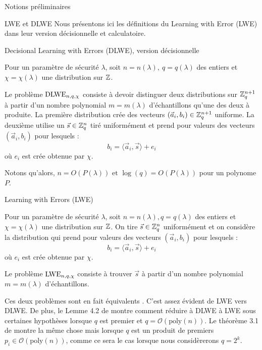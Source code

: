 \begin{section}{Notions préliminaires}
	\begin{subsection}{LWE et DLWE}
	Nous présentons ici les définitions du Learning with Error (LWE) dans leur version décisionnelle et calculatoire.
	
	\begin{definition}{Decisional Learning with Errors (DLWE), version décisionnelle}

	Pour un paramètre de sécurité $\lambda$, soit $n = n(\lambda),\ q = q(\lambda)$ des entiers et $\chi = \chi(\lambda)$ une distribution sur $\mathbb{Z}$.
	
	Le problème $\text{DLWE}_{n,q,\chi}$ consiste à devoir distinguer deux distributions sur $\mathbb{Z}_q^{n+1}$ à partir d'un nombre polynomial $m = m(\lambda)$ d'échantillons qu'une des deux à produite. La première distribution crée des vecteurs $(\vec{a}_i,b_i) \in \mathbb{Z}_q^{n+1}$ uniforme. La deuxième utilise un $\vec{s} \in \mathbb{Z}_q^n$ tiré uniformément et prend pour valeurs des vecteurs $(\vec{a}_i, b_i)$ pour lesquels :
	\[ b_i = \langle \vec{a}_i, \vec{s} \rangle + e_i \]
	où $e_i$ est crée obtenue par $\chi$. \\
	\end{definition}
	Notons qu'alors, $n = O(P(\lambda))\text{ et }\log(q) = O(P(\lambda))$ pour un polynome $P$.

	\begin{definition}{Learning with Errors (LWE)}
	
	Pour un paramètre de sécurité $\lambda$, soit $n = n(\lambda),q = q(\lambda)$ des entiers et $\chi = \chi(\lambda)$ une distribution sur $\mathbb{Z}$. On tire $\vec{s} \in \mathbb{Z}_q^n$ uniformément et on considère la distribution qui prend pour valeurs des vecteurs $(\vec{a}_i, b_i)$ pour lesquels :
	\[ b_i = \langle \vec{a}_i, \vec{s} \rangle + e_i \]
	où $e_i$ est crée obtenue par $\chi$.

	Le problème $\text{LWE}_{n,q,\chi}$ consiste à trouver $\vec{s}$ à partir d'un nombre polynomial $m = m(\lambda)$ d'échantillons.
	\end{definition}

	Ces deux problèmes sont en fait \og équivalents \fg. C'est assez évident de LWE vers DLWE. De plus, le Lemme 4.2 de \cite{STOC:Regev05} montre comment réduire à DLWE à LWE sous certaines hypothèses lorsque $q$ est premier et $q = \mathcal{O}(\text{poly}(n))$. Le théorème 3.1 de \cite{EPRINT:MicPei11} montre la même chose mais lorsque $q$ est un produit de premiers $p_i \in \mathcal{O}(\text{poly}(n))$, comme ce sera le cas lorsque nous considèrerons $q = 2^k$.


\end{subsection}
\end{section}
